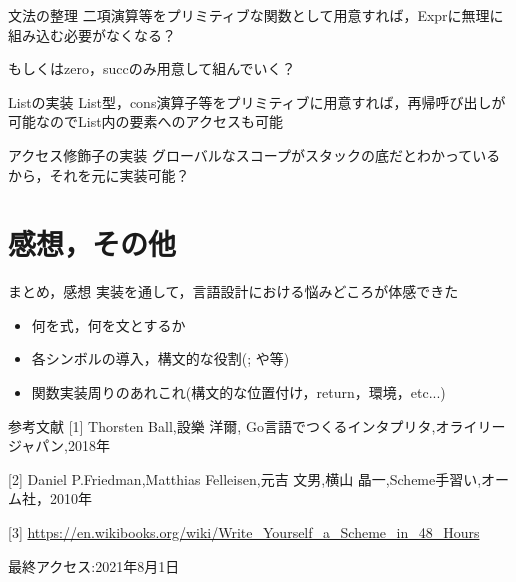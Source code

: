 \documentclass[uplatex,dvipdfmx,ja=standard]{beamer}
\begin{document}
\begin{frame}{文法の整理}
二項演算等をプリミティブな関数として用意すれば，Exprに無理に組み込む必要がなくなる？

もしくはzero，succのみ用意して組んでいく？
\end{frame}

\begin{frame}[fragile]{Listの実装}
List型，cons演算子等をプリミティブに用意すれば，再帰呼び出しが可能なのでList内の要素へのアクセスも可能

\end{frame}

\begin{frame}[fragile]{アクセス修飾子の実装}
グローバルなスコープがスタックの底だとわかっているから，それを元に実装可能？
\end{frame}

\section{感想，その他}

\begin{frame}{まとめ，感想}
実装を通して，言語設計における悩みどころが体感できた
    \begin{itemize}
        \item 何を式，何を文とするか
        \item 各シンボルの導入，構文的な役割(; や{}等)
        \item 関数実装周りのあれこれ(構文的な位置付け，return，環境，etc...)
    \end{itemize}
\end{frame}


\begin{frame}{参考文献}
    [1] Thorsten Ball,設樂 洋爾, Go言語でつくるインタプリタ,オライリージャパン,2018年

    [2] Daniel P.Friedman,Matthias Felleisen,元吉 文男,横山 晶一,Scheme手習い,オーム社，2010年
    
    [3] \url{https://en.wikibooks.org/wiki/Write_Yourself_a_Scheme_in_48_Hours}

    最終アクセス:2021年8月1日
\end{frame}

%
\end{document}
